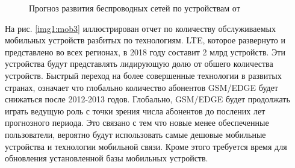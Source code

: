 \pgfplotsset{width=15cm, height=10cm, compat=1.3}
\begin{figure} [h]
  \center
{}
\caption{Прогноз развития беспроводных сетей по устройствам от \cite{ericsson}}
  \label{img1:mob2}
\end{figure}


\clearpage


На рис. \ref{img1:mob3} иллюстрирован отчет по количеству обслуживаемых мобильных устройств разбитых по технологиям. LTE, которое развернуто и представлено во всех регионах, в 2018 году составит 2 млрд устройств. Эти устройства будут представлять лидирующую долю от обшего количества устройств. Быстрый переход на более совершенные технологии в развитых странах, означает что глобально количество абонентов GSM/EDGE будет снижаться после 2012-2013 годов. Глобально, GSM/EDGE будет продолжать играть ведущую роль с точки зрения числа абонентов до послених лет прогнозного периода. Это связано с тем что новые менее обеспеченные пользователи, вероятно будут использовать самые дешовые мобильные устройства и технологии мобильной связи. Кроме этого требуется время для обновления установленной базы мобильных устройств.


